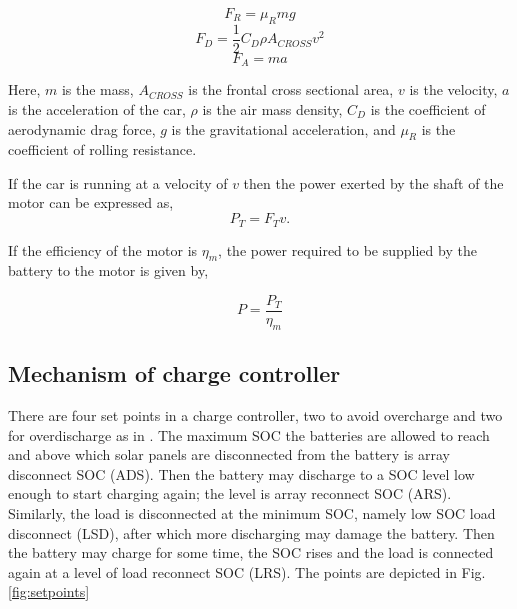 \documentclass[journal]{IEEEtran/IEEEtran}
\newcommand{\figref}[1]{Fig. \ref{#1}}
\begin{document}
	\begin{equation}
	\label{eq:Froll}
	F_{R} = \mu_Rmg
	\end{equation}
	\begin{equation}
	\label{eq:Fdrag}
	F_{D} = \frac{1}{2} C_D \rho A_{C\!R\!O\!S\!S} v^2
	\end{equation}
	\begin{equation}
	\label{eq:Facc}
	F_{A} = ma
	\end{equation}
	
	Here, $m$ is the mass, $A_{\mathit{CROSS}}$ is the frontal cross sectional area, $v$ is the velocity, $a$ is the acceleration of the car, $\rho$ is the air mass density, $C_D$ is the coefficient of aerodynamic drag force,  $g$ is the gravitational acceleration, and $\mu_R$ is the coefficient of rolling resistance.
	
	If the car is running at a velocity of $v$ then the power exerted by the shaft of the motor can be expressed as,
	\begin{equation}
	\label{eq:PT}
	P_{T} = F_T v.
	\end{equation}
	
	If the efficiency of the motor is $\eta_{m}$, the power required to be supplied by the battery to the motor is given by,
	
	\begin{equation}
	\label{eq:Preq}
	P = \frac{P_T}{\eta_{m}}
	\end{equation}
	
	\subsection{Mechanism of charge controller}
	There are four set points in a charge controller, two to avoid overcharge and two for overdischarge as in \cite{leitman}. The maximum 
	SOC the batteries are allowed to reach and above which solar panels are disconnected from the battery is array disconnect SOC (ADS). Then the battery may discharge to a SOC level low enough to start charging again; the level is array reconnect SOC (ARS). Similarly, the load is disconnected at the minimum SOC, namely low SOC load disconnect (LSD), after which more discharging may damage the battery. Then the battery may charge for some time, the SOC rises and the load is connected again at a level of load reconnect SOC (LRS). The points are depicted in \figref{fig:setpoints} 
	
\end{document}
